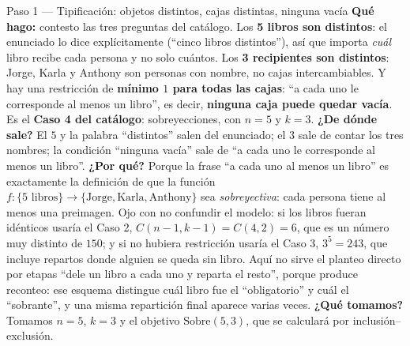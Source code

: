 \documentclass[11pt]{article}
\begin{document}
\begin{sol}

\begin{paso}{Paso 1 --- Tipificación: objetos distintos, cajas distintas, ninguna vacía}
\textbf{Qué hago:} contesto las tres preguntas del catálogo. Los \textbf{5 libros son distintos}: el enunciado lo dice explícitamente (``cinco libros distintos''), así que importa \emph{cuál} libro recibe cada persona y no solo cuántos. Los \textbf{3 recipientes son distintos}: Jorge, Karla y Anthony son personas con nombre, no cajas intercambiables. Y hay una restricción de \textbf{mínimo $1$ para todas las cajas}: ``a cada uno le corresponde al menos un libro'', es decir, \textbf{ninguna caja puede quedar vacía}. Es el \textbf{Caso 4 del catálogo}: sobreyecciones, con $n=5$ y $k=3$.
\textbf{¿De dónde sale?} El $5$ y la palabra ``distintos'' salen del enunciado; el $3$ sale de contar los tres nombres; la condición ``ninguna vacía'' sale de ``a cada uno le corresponde al menos un libro''.
\textbf{¿Por qué?} Porque la frase ``a cada uno al menos un libro'' es exactamente la definición de que la función $f:\{5\text{ libros}\}\to\{\text{Jorge},\text{Karla},\text{Anthony}\}$ sea \emph{sobreyectiva}: cada persona tiene al menos una preimagen. Ojo con no confundir el modelo: si los libros fueran idénticos usaría el Caso 2, $C(n-1,k-1)=C(4,2)=6$, que es un número muy distinto de $150$; y si no hubiera restricción usaría el Caso 3, $3^5=243$, que incluye repartos donde alguien se queda sin libro. Aquí no sirve el planteo directo por etapas ``dele un libro a cada uno y reparta el resto'', porque produce reconteo: ese esquema distingue cuál libro fue el ``obligatorio'' y cuál el ``sobrante'', y una misma repartición final aparece varias veces.
\textbf{¿Qué tomamos?} Tomamos $n=5$, $k=3$ y el objetivo $\text{Sobre}(5,3)$, que se calculará por inclusión--exclusión.
\end{paso}


\end{sol}
\end{document}
